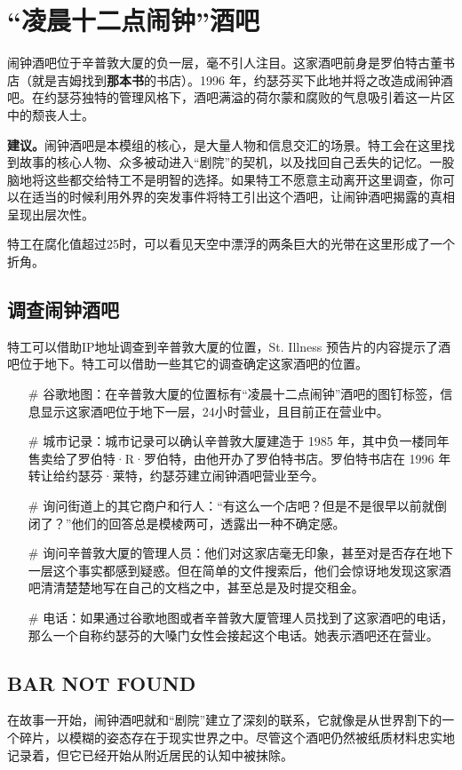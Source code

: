 \section{“凌晨十二点闹钟”酒吧}

闹钟酒吧位于辛普敦大厦的负一层，毫不引人注目。这家酒吧前身是罗伯特古董书店（就是吉姆找到\textbf{那本书}的书店）。1996 年，约瑟芬买下此地并将之改造成闹钟酒吧。在约瑟芬独特的管理风格下，酒吧满溢的荷尔蒙和腐败的气息吸引着这一片区中的颓丧人士。

\textbf{建议。}闹钟酒吧是本模组的核心，是大量人物和信息交汇的场景。特工会在这里找到故事的核心人物、众多被动进入“剧院”的契机，以及找回自己丢失的记忆。一股脑地将这些都交给特工不是明智的选择。如果特工不愿意主动离开这里调查，你可以在适当的时候利用外界的突发事件将特工引出这个酒吧，让闹钟酒吧揭露的真相呈现出层次性。

特工在腐化值超过25时，可以看见天空中漂浮的两条巨大的光带在这里形成了一个折角。

\subsection{调查闹钟酒吧}

特工可以借助IP地址调查到辛普敦大厦的位置，St. Illness 预告片的内容提示了酒吧位于地下。特工可以借助一些其它的调查确定这家酒吧的位置。

\begin{itemize}
    \item[\#] 谷歌地图：在辛普敦大厦的位置标有“凌晨十二点闹钟”酒吧的图钉标签，信息显示这家酒吧位于地下一层，24小时营业，且目前正在营业中。
    \item[\#] 城市记录：城市记录可以确认辛普敦大厦建造于 1985 年，其中负一楼同年售卖给了罗伯特·R·罗伯特，由他开办了罗伯特书店。罗伯特书店在 1996 年转让给约瑟芬·莱特，约瑟芬建立闹钟酒吧营业至今。
    \item[\#] 询问街道上的其它商户和行人：“有这么一个店吧？但是不是很早以前就倒闭了？”他们的回答总是模棱两可，透露出一种不确定感。
    \item[\#] 询问辛普敦大厦的管理人员：他们对这家店毫无印象，甚至对是否存在地下一层这个事实都感到疑惑。但在简单的文件搜索后，他们会惊讶地发现这家酒吧清清楚楚地写在自己的文档之中，甚至总是及时提交租金。
    \item[\#] 电话：如果通过谷歌地图或者辛普敦大厦管理人员找到了这家酒吧的电话，那么一个自称约瑟芬的大嗓门女性会接起这个电话。她表示酒吧还在营业。
\end{itemize}

\subsection{BAR NOT FOUND}
在故事一开始，闹钟酒吧就和“剧院”建立了深刻的联系，它就像是从世界割下的一个碎片，以模糊的姿态存在于现实世界之中。尽管这个酒吧仍然被纸质材料忠实地记录着，但它已经开始从附近居民的认知中被抹除。

